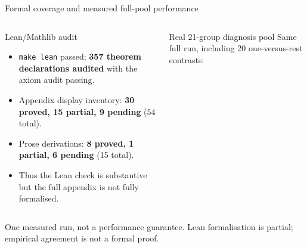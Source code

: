 \documentclass[aspectratio=169,10pt]{beamer}
\begin{document}
\begin{frame}{Formal coverage and measured full-pool performance}
\begin{columns}[T,onlytextwidth]
\begin{block}{Lean/Mathlib audit}
\begin{itemize}
  \item \texttt{make lean} passed; \textbf{357 theorem declarations audited}
        with the axiom audit passing.
  \item Appendix display inventory: \textbf{30 proved, 15 partial,
        9 pending} (54 total).
  \item Prose derivations: \textbf{8 proved, 1 partial, 6 pending}
        (15 total).
  \item Thus the Lean check is substantive but the full appendix is
        \alert{not fully formalised}.
\end{itemize}
\end{block}
\begin{block}{Real 21-group diagnosis pool}
\small Same full run, including 20 one-versus-rest contrasts:
\begin{center}
\end{center}
\end{block}
\end{columns}
\vfill
\scriptsize One measured run, not a performance guarantee. Lean formalisation
is partial; empirical agreement is not a formal proof.
\end{frame}
\end{document}
